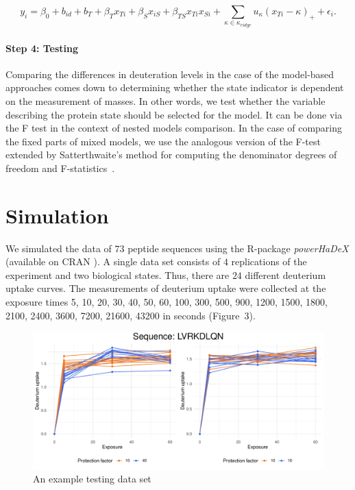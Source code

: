 \documentclass[]{MathAppl18}
\begin{document}
\begin{equation}
\label{final3}
    y_i =  \beta_0 + b_{id} + b_{T}  + \beta_T x_{Ti} + \beta_S x_{iS} + \beta_{TS}x_{Ti}x_{Si}+ \sum_{\kappa \in \kappa_{ridge}} u_\kappa (x_{Ti} - \kappa)_+ + \epsilon_i.
\end{equation}


\paragraph{Step 4: Testing}

Comparing the differences in deuteration levels in the case of the model-based approaches comes down to determining whether the state indicator is dependent on the measurement of masses. In other words, we test whether the variable describing the protein state should be selected for the model. It can be done via the F test in the context of nested models comparison. In the case of comparing the fixed parts of mixed models, we use the analogous version of the F-test extended by Satterthwaite's method for computing the denominator degrees of freedom and F-statistics~\citep{kuznetsova2017lmertest}. %


\section{Simulation}

We simulated the data of $73$ peptide sequences using the R-package \textit{powerHaDeX} (available on CRAN \citep{powerHaDeX}). A single data set consists of $4$ replications of the experiment and two biological states. Thus, there are $24$ different deuterium uptake curves. The measurements of deuterium uptake were collected at the exposure times 5, 10, 20, 30, 40, 50, 60, 100, 300, 500, 900, 1200, 1500, 1800, 2100, 2400, 3600, 7200, 21600, 43200 in seconds (Figure~3). 
 \begin{figure}[h]
    \label{combined_data}
    \centering
    \includegraphics[width=1\textwidth]{Figures/plot_curves.pdf}
    \caption{An example testing data set}
\end{figure}
 
\end{document}
